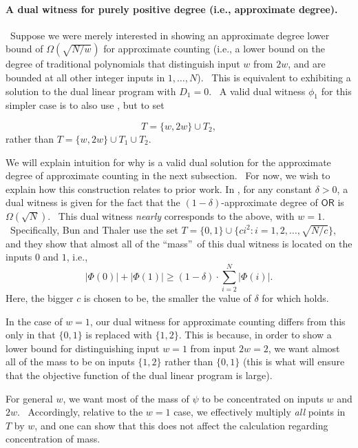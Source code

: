 \documentclass[10pt,a4paper]{article}
\newcommand{\<}{\langle}
\renewcommand{\>}{\rangle}
\newcommand{\para}[1]{\paragraph{#1}}
\begin{document}
\label{sec:intuition}

\para{A dual witness for purely positive degree (i.e.,
approximate degree).} \ Suppose we were merely interested in showing an
approximate degree lower bound of $\Omega (\sqrt{N/w})$ for approximate
counting (i.e., a lower bound on the degree of traditional polynomials that
distinguish input $w$ from $2w$, and are bounded at all other integer inputs
in $1,\dots ,N$). \ This is equivalent to exhibiting a solution to the dual
linear program with $D_{1}=0$. \ A valid dual witness $\phi_1$ for this
simpler case is to also use , but to set

\begin{equation}  \label{simplerT1}
T= \{w, 2w\} \cup T_2,
\end{equation}
rather than $T=\{w, 2w\} \cup T_1 \cup T_2$.

We will explain intuition for why  is a valid dual
solution for the approximate degree of approximate counting in the next
subsection. \ For now, we wish to explain how this construction relates to
prior work. In \cite{bt13}, for any constant $\delta >0$, a dual
witness is given for the fact that the $(1-\delta )$-approximate degree
of $\mathsf{OR}$ is $\Omega (\sqrt{N})$. \ This dual witness \emph{nearly}
corresponds to the above, with $w=1$. \ Specifically, Bun and Thaler \cite{bt13} use the
set $T=\{0,1\}\cup \{ci^{2}\colon i=1,2,\dots ,\sqrt{N/c}\}$, and they show
that almost all of the \textquotedblleft mass\textquotedblright\ of this
dual witness is located on the inputs $0$ and $1$, i.e.,
\begin{equation}
\left\vert \Phi (0)\right\vert +\left\vert \Phi (1)\right\vert \geq
(1-\delta )\cdot \sum_{i=2}^{N}\left\vert \Phi (i)\right\vert .
\label{epseq}
\end{equation}
Here, the bigger $c$ is chosen to be, the smaller the value of $\delta$
for which  holds.

In the case of $w=1$, our dual witness for approximate counting differs from
this only in that $\{0, 1\}$ is replaced with $\{1, 2\}$. This is
because, in order to show a lower bound for distinguishing input $w=1$ from
input $2w=2$, we want almost all of the mass to be on inputs $\{1, 2\}$
rather than $\{0, 1\}$ (this is what will ensure that the objective function
of the dual linear program is large).

For general $w$, we want most of the mass of $\psi $ to be concentrated on
inputs $w$ and $2w$. \ Accordingly, relative to the $w=1$ case, we
effectively multiply \emph{all} points in $T$ by $w$, and one can show that
this does not affect the calculation regarding concentration of mass.
\end{document}
